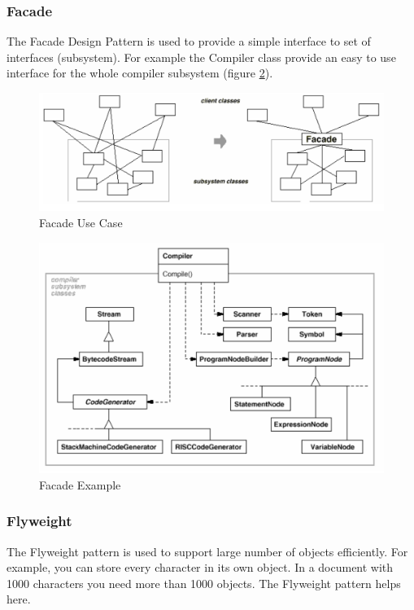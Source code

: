 \documentclass[11pt]{article}
\begin{document}
\subsubsection{Facade}
\label{sec:org58a31c1}
The Facade Design Pattern is used to provide a simple interface to set of interfaces (subsystem).
For example the Compiler class provide an easy to use interface for the whole compiler subsystem (figure \ref{fig:facade-example}).


\begin{figure}[htbp]
\centering
\includegraphics[width=.9\linewidth]{img/use_case_facade.png}
\caption{\label{fig:facade-use-case}Facade Use Case}
\end{figure}


\begin{figure}[htbp]
\centering
\includegraphics[width=.9\linewidth]{img/facade_example.png}
\caption{\label{fig:facade-example}Facade Example}
\end{figure}
\subsubsection{Flyweight}
\label{sec:org4a45ffd}
The Flyweight pattern is used to support large number of objects efficiently.
For example, you can store every character in its own object.
In a document with 1000 characters you need more than 1000 objects.
The Flyweight pattern helps here.
\end{document}
